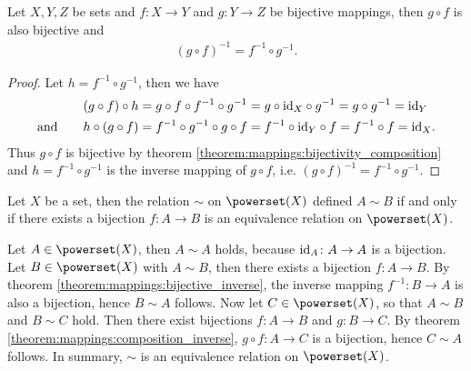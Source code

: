 \begin{theorem}\label{theorem:mappings:composition_inverse}
    Let $X,Y,Z$ be sets and $f\colon X\rightarrow Y$ and $g\colon Y\rightarrow Z$ be bijective mappings, then $g\circ f$ is also bijective and
    \begin{align}(g\circ f)^{-1}=f^{-1}\circ g^{-1}.\end{align}
\end{theorem}
\begin{proof}
    Let $h=f^{-1}\circ g^{-1}$, then we have
    \begin{align}
        (g\circ f)\circ h&= g\circ f\circ f^{-1}\circ g^{-1}=g\circ \text{id}_X\circ g^{-1}=g\circ g^{-1}=\text{id}_Y\\
        \text{and}\qquad h\circ (g\circ f)&=f^{-1}\circ g^{-1}\circ g\circ f=f^{-1}\circ\text{id}_Y\circ f=f^{-1}\circ f=\text{id}_X.
    \end{align}
    Thus $g\circ f$ is bijective by theorem \ref{theorem:mappings:bijectivity_composition} and $h=f^{-1}\circ g^{-1}$ is the inverse mapping of $g\circ f$, i.e. $(g\circ f)^{-1}=f^{-1}\circ g^{-1}$.
\end{proof}

\begin{examples}
    \begin{exampleenumerate}
        \item\label{example:mappings:bijection_equivalence_relation} Let $X$ be a set, then the relation $\sim$ on $\powerset(X)$ defined $A\sim B$ if and only if there exists a bijection $f\colon A\rightarrow B$ is an equivalence relation on $\powerset(X)$.
        \begin{miniproof}
            Let $A\in\powerset(X)$, then $A\sim A$ holds, because $\text{id}_A\colon A\rightarrow A$ is a bijection. Let $B\in\powerset(X)$ with $A\sim B$, then there exists a bijection $f\colon A\rightarrow B$. By theorem \ref{theorem:mappings:bijective_inverse}, the inverse mapping $f^{-1}\colon B\rightarrow A$ is also a bijection, hence $B\sim A$ follows. Now let $C\in\powerset(X)$, so that $A\sim B$ and $B\sim C$ hold. Then there exist bijections $f\colon A\rightarrow B$ and $g\colon B\rightarrow C$. By theorem \ref{theorem:mappings:composition_inverse}, $g\circ f\colon A\rightarrow C$ is a bijection, hence $C\sim A$ follows. In summary, $\sim$ is an equivalence relation on $\powerset(X)$.
        \end{miniproof}
    \end{exampleenumerate}
\end{examples}

